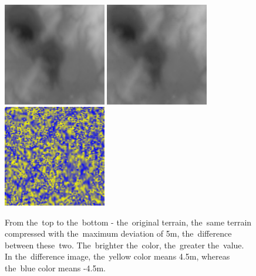 \begin{figure}
	\includegraphics[width=0.4\textwidth]{figures/samp_orig.png}
	\includegraphics[width=0.4\textwidth]{figures/samp_comp.png}
	\includegraphics[width=0.4\textwidth]{figures/samp_diff.png}
	\caption{From the~top to the~bottom - the~original terrain, the~same terrain compressed with the~maximum deviation of 5m, the~difference between these~two. The~brighter the~color, the~greater the~value. In the~difference image, the~yellow color means 4.5m, whereas the~blue color means -4.5m.}
	\label{fig:result_samples}
\end{figure}

\newcommand{\incexampl}[1]{\texttt{[image: \#1]}}

